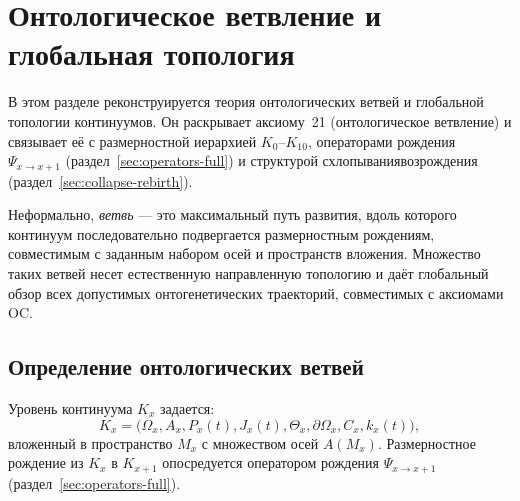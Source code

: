 
\section{Онтологическое ветвление и глобальная топология}
\label{sec:branching-topology}

В этом разделе реконструируется теория онтологических ветвей и глобальной
топологии континуумов. Он раскрывает аксиому~21 (онтологическое
ветвление) и связывает её с размерностной иерархией
\(K_0\)–\(K_{10}\), операторами рождения
\(\Psi_{x\to x+1}\) (раздел~\ref{sec:operators-full}) и структурой
схлопывания\textendash возрождения (раздел~\ref{sec:collapse-rebirth}).

Неформально, \emph{ветвь} — это максимальный путь развития, вдоль которого
континуум последовательно подвергается размерностным рождениям, совместимым с
заданным набором осей и пространств вложения. Множество таких ветвей
несет естественную направленную топологию и даёт глобальный обзор всех
допустимых онтогенетических траекторий, совместимых с аксиомами OC.

\subsection{Определение онтологических ветвей}

Уровень континуума \(K_x\) задается:
\[
  K_x =
  \big(
    \Omega_x, A_x, P_x(t), J_x(t),
    \Theta_x, \partial\Omega_x, C_x, k_x(t)
  \big),
\]
вложенный в пространство \(M_x\) с множеством осей \(A(M_x)\). Размерностное
рождение из \(K_x\) в \(K_{x+1}\) опосредуется оператором рождения
\(\Psi_{x\to x+1}\) (раздел~\ref{sec:operators-full}).

